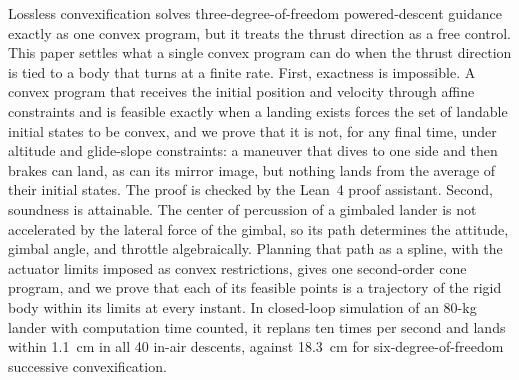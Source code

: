 \begin{aiaaabstract}
Lossless convexification solves three-degree-of-freedom powered-descent guidance exactly as one convex program, but it
treats the thrust direction as a free control. This paper settles what a single convex program can do when the thrust
direction is tied to a body that turns at a finite rate. First, exactness is impossible. A convex program that receives the
initial position and velocity through affine constraints and is feasible exactly when a landing exists forces the set of
landable initial states to be convex, and we prove that it is not, for any final time, under altitude and glide-slope
constraints: a maneuver that dives to one side and then brakes can land, as can its mirror image, but nothing lands from the
average of their initial states. The proof is checked by the Lean~4 proof assistant. Second, soundness is attainable. The
center of percussion of a gimbaled lander is not accelerated by the lateral force of the gimbal, so its path determines the
attitude, gimbal angle, and throttle algebraically. Planning that path as a spline, with the actuator limits imposed as
convex restrictions, gives one second-order cone program, and we prove that each of its feasible points is a trajectory of
the rigid body within its limits at every instant. In closed-loop simulation of an 80-kg lander with computation time
counted, it replans ten times per second and lands within 1.1~cm in all 40 in-air descents, against 18.3~cm for
six-degree-of-freedom successive convexification.
\end{aiaaabstract}


